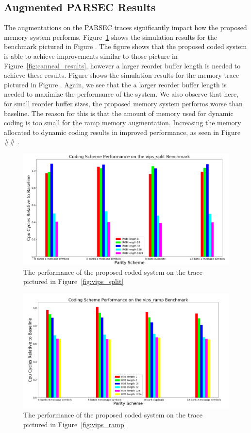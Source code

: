 \subsection{Augmented PARSEC Results}
\label{sec:aug_results}

The augmentations on the PARSEC traces significantly impact how the proposed memory system performs. Figure~\ref{fig:vips_split_results} shows the simulation results for the benchmark pictured in Figure . The figure shows that the proposed coded system is able to achieve improvements similar to those picture in Figure~\ref{fig:canneal_results}, however a larger reorder buffer length is needed to achieve these results. Figure  shows the simulation results for the memory trace pictured in Figure  . Again, we see that the a larger reorder buffer length is needed to maximize the performance of the system. We also observe that here, for small reorder buffer sizes, the proposed memory system performs worse than baseline. The reason for this is that the amount of memory used for dynamic coding is too small for the ramp memory augmentation. Increasing the memory allocated to dynamic coding results in improved performance, as seen in Figure \#\# .

\begin{figure}[h!]
		\includegraphics[width=\linewidth]{figures/vips_split_results.png}
		\caption{The performance of the proposed coded system on the trace pictured in Figure~\ref{fig:vips_split} }
		\label{fig:vips_split_results}
\end{figure}


\begin{figure}[h!]
		\includegraphics[width=\linewidth]{figures/vips_ramp_results.png}
		\caption{The performance of the proposed coded system on the trace pictured in Figure~\ref{fig:vips_ramp}}
		\label{fig:vips_ramp_results}
\end{figure}